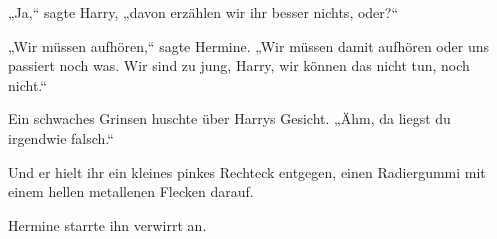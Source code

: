 „Ja,“ sagte Harry, „davon erzählen wir ihr besser nichts, oder?“

„Wir müssen aufhören,“ sagte Hermine. „Wir müssen damit aufhören oder uns passiert noch was. Wir sind zu jung, Harry, wir können das nicht tun, noch nicht.“

Ein schwaches Grinsen huschte über Harrys Gesicht. „Ähm, da liegst du irgendwie falsch.“

Und er hielt ihr ein kleines pinkes Rechteck entgegen, einen Radiergummi mit einem hellen metallenen Flecken darauf.

Hermine starrte ihn verwirrt an.

